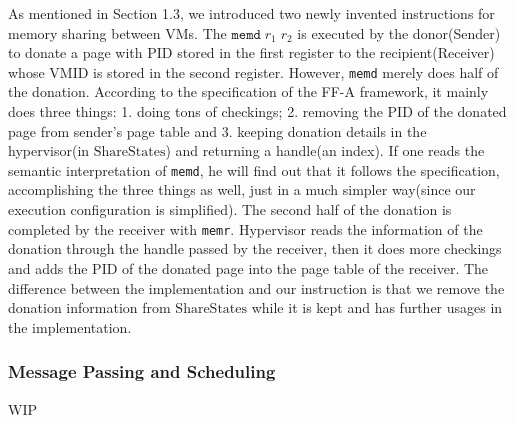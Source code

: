\documentclass[a4paper]{article}
\newcommand*{\SSS}{\text{ShareStates}}
\newcommand*{\PID}{\text{PID}}
\newcommand*{\VMID}{\text{VMID}}
\newcommand*{\instr}[1]{\texttt{#1}}
\begin{document}
As mentioned in Section 1.3, we introduced two newly invented instructions for
memory sharing between VMs. The $\instr{memd}\; r_{1}\; r_{2}$ is executed by
the donor(Sender) to donate a page with $\PID$ stored in the first register to
the recipient(Receiver) whose $\VMID$ is stored in the second register. However,
\instr{memd} merely does half of the donation. According to the specification of
the FF-A framework, it mainly does three things: 1. doing tons of checkings; 2.
removing the $\PID$ of the donated page from sender's page table and 3. keeping
donation details in the hypervisor(in $\SSS$) and returning a handle(an index).
If one reads the semantic interpretation of \instr{memd}, he will find out that
it follows the specification, accomplishing the three things as well,
just in a much simpler way(since our execution configuration is simplified). The second half of the donation is
completed by the receiver with \instr{memr}. Hypervisor reads the information of
the donation through the handle passed by the receiver, then it does more
checkings and adds the $\PID$ of the donated page into the page table of the
receiver. The difference between the implementation and our
instruction is that we remove the donation information from $\SSS$ while it is
kept and has further usages in the implementation.

\subsubsection{Message Passing and Scheduling}
WIP

\end{document}

